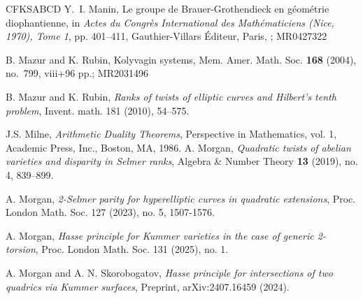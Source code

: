 \documentclass[10pt]{amsart}
\numberwithin{equation}{section}
\theoremstyle{remark}
\theoremstyle{definition}
\theoremstyle{definition}
\theoremstyle{definition}
\theoremstyle{definition}
\theoremstyle{definition}
\theoremstyle{definition}
\theoremstyle{definition}
\theoremstyle{definition}
\begin{document}
\begin{thebibliography}{CFKSABCD}
%              
%              
Y.~I. Manin, Le groupe de Brauer-Grothendieck en g\'eom\'etrie diophantienne, in {\it Actes du Congr\`es International des Math\'ematiciens (Nice, 1970), Tome 1}, pp. 401--411, Gauthier-Villars \'Editeur, Paris, ; MR0427322

B. Mazur and K. Rubin, Kolyvagin systems, Mem. Amer. Math. Soc. {\bf 168} (2004), no.~799, viii+96 pp.; MR2031496

B. Mazur and K. Rubin, \textit{Ranks of twists of elliptic curves and Hilbert’s tenth problem}, Invent. math. 181 (2010), 54--575.
   
             
J.S. Milne,  \textit{Arithmetic Duality Theorems}, Perspective in Mathematics, vol. 1, Academic Press, Inc., Boston, MA, 1986. 
%              
%
%
%
A. Morgan, \textit{Quadratic twists of abelian varieties and disparity in
              {S}elmer ranks},  Algebra \& Number Theory \textbf{13} (2019), no. 4, 839--899.
              
A. Morgan, \textit{2-Selmer parity for hyperelliptic curves in quadratic extensions}, Proc. London Math. Soc. 127 (2023), no. 5, 1507-1576.

A. Morgan, \textit{ Hasse principle for Kummer varieties in the case of generic 2-torsion}, Proc. London Math. Soc. 131 (2025), no. 1.

A. Morgan and A. N. Skorobogatov,  \textit{Hasse principle for intersections of two quadrics via Kummer surfaces}, Preprint,  arXiv:2407.16459 (2024).
              

\end{thebibliography}
\end{document}
